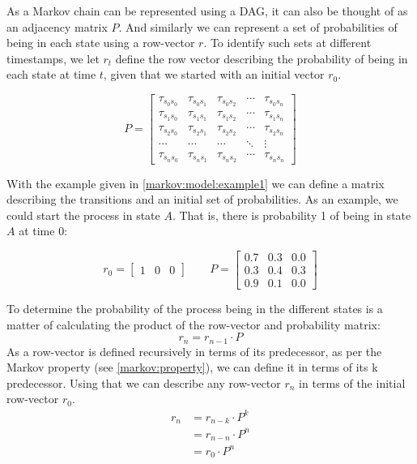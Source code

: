 As a Markov chain can be represented using a DAG, it can also be thought of as an adjacency matrix $P$.
And similarly we can represent a set of probabilities of being in each state using a row-vector $r$.
To identify such sets at different timestamps, we let $r_t$ define the row vector describing the probability of being in each state at time $t$, given that we started with an initial vector $r_0$.

\begin{equation}
P = \begin{bmatrix}
    \tau_{{s_0}{s_0}} & \tau_{{s_0}{s_1}} & \tau_{{s_0}{s_2}} & \cdots & \tau_{{s_0}{s_n}} \\[0.3em]
    \tau_{{s_1}{s_0}} & \tau_{{s_1}{s_1}} & \tau_{{s_1}{s_2}} & \cdots & \tau_{{s_1}{s_n}} \\[0.3em]
    \tau_{{s_2}{s_0}} & \tau_{{s_2}{s_1}} & \tau_{{s_2}{s_2}} & \cdots & \tau_{{s_2}{s_n}} \\[0.3em]
          \cdots      &      \cdots       &      \cdots       & \ddots &     \vdots \\[0.3em]
   \tau_{{s_n}{s_0}} & \tau_{{s_n}{s_1}} & \tau_{{s_n}{s_2}} & \cdots & \tau_{{s_n}{s_n}}
     \end{bmatrix}
\end{equation}

With the example given in \cref{markov:model:example1} we can define a matrix describing the transitions and an initial set of probabilities.
As an example, we could start the process in state $A$.
That is, there is probability 1 of being in state $A$ at time 0:

\begin{equation}\label{markov:model:example1:initial}
r_0 = \begin{bmatrix} 1 & 0 & 0 \end{bmatrix}
\quad\quad
P = \begin{bmatrix}
       0.7 & 0.3 & 0.0 \\[0.3em]
       0.3 & 0.4 & 0.3 \\[0.3em]
       0.9 & 0.1 & 0.0
     \end{bmatrix}
\end{equation}

To determine the probability of the process being in the different states is a matter of calculating the product of the row-vector and probability matrix:
$$r_n = r_{n-1} \cdot P$$
As a row-vector is defined recursively in terms of its predecessor, as per the Markov property (see \cref{markov:property}), we can define it in terms of its k predecessor.
Using that we can describe any row-vector $r_n$ in terms of the initial row-vector $r_0$.
\begin{align}
r_n &= r_{n-k} \cdot P^k\\
    &= r_{n - n} \cdot P^n\nonumber\\
    &= r_0 \cdot P^n\nonumber
\end{align}
